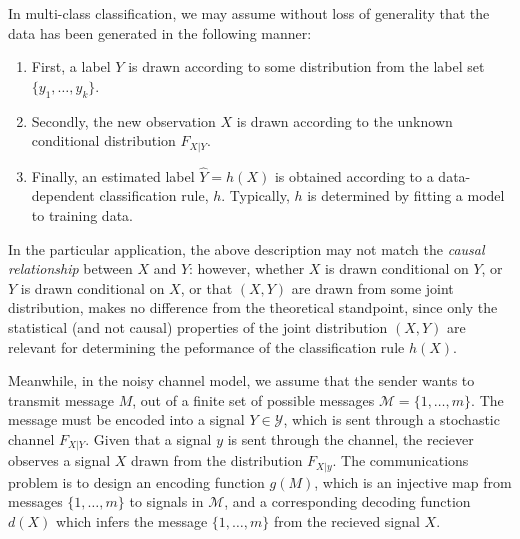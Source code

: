 In multi-class classification, we may assume without loss of generality that the data has been generated in the following manner:
\begin{enumerate}
\item First, a label $Y$ is drawn according to some distribution from the label set $\{y_1,\hdots, y_k\}$.
\item Secondly, the new observation $X$ is drawn according to the unknown conditional distribution $F_{X|Y}$.
\item Finally, an estimated label $\hat{Y} = h(X)$ is obtained
  according to a data-dependent classification rule, $h$.
  Typically, $h$ is determined by fitting a model to training data.
\end{enumerate}
In the particular application, the above description may not match the
\emph{causal relationship} between $X$ and $Y$: however, whether $X$
is drawn conditional on $Y$, or $Y$ is drawn conditional on $X$, or
that $(X, Y)$ are drawn from some joint distribution, makes no
difference from the theoretical standpoint, since only the statistical
(and not causal) properties of the joint distribution $(X, Y)$ are
relevant for determining the peformance of the classification rule $h(X)$.

Meanwhile, in the noisy channel model, we assume that the sender wants
to transmit message $M$, out of a finite set of possible messages
$\mathcal{M} = \{1,\hdots, m\}$.  The message must be encoded into a
signal $Y \in \mathcal{Y}$, which is sent through a stochastic channel
$F_{X|Y}$.  Given that a signal $y$ is sent through the channel, the
reciever observes a signal $X$ drawn from the distribution $F_{X|y}$.
The communications problem is to design an encoding function $g(M)$,
which is an injective map from messages $\{1,\hdots,m\}$ to signals in
$\mathcal{M}$, and a corresponding decoding function $d(X)$ which
infers the message $\{1,\hdots, m\}$ from the recieved signal $X$.

